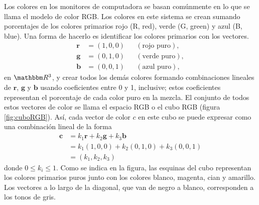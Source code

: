 \begin{adjustwidth}{-7.6cm}{-2cm}
    \begin{tcolorbox}[
        theorem style=change break,
        enhanced,
        breakable,
        boxrule=0pt,
        frame hidden,
        left = 1.8cm,
        right = 1.8cm,
        top=4mm,
        bottom=2mm,
        colback=cw2,
        coltitle=cw0,
        attach title to upper={\ },
        sharp corners,
        borderline north={1.5pt}{0pt}{cw0},
        title = {Aplicación de combinaciones lineales a modelos de color:},
        fonttitle=\selectfont\Lato\bfseries\LARGE,
        fontupper=\normalsize
    ]
        \begin{multicols}{2}
            Los colores en los monitores de computadora se basan comúnmente en lo que se llama el modelo de color RGB. Los colores en este sistema se crean sumando porcentajes de los colores primarios rojo (R, red), verde (G, green) y azul (B, blue). Una forma de hacerlo es identificar los colores primarios con los vectores.
            \begin{align*}
                \mathbf{r} & = (1, 0, 0) && (\text{rojo puro}), \\
                \mathbf{g} & = (0, 1, 0) && (\text{verde puro}), \\
                \mathbf{b} & = (0, 0, 1) && (\text{azul puro}),
            \end{align*}
            en $\RR[3]$, y crear todos los demás colores formando combinaciones lineales de $\mathbf{r}$, $\mathbf{g}$ y $\mathbf{b}$ usando coeficientes entre 0 y 1, inclusive; estos coeficientes representan el porcentaje de cada color puro en la mezcla. El conjunto de todos estos vectores de color se llama el espacio RGB o el cubo RGB (figura \ref{fig:cuboRGB}). Así, cada vector de color $c$ en este cubo se puede expresar como una combinación lineal de la forma
            \begin{align*}
                \mathbf{c} & = k_1\mathbf{r} + k_2\mathbf{g} + k_3\mathbf{b} \\
                & = k_1(1, 0, 0) + k_2(0, 1, 0) + k_3(0, 0, 1) \\
                & = (k_1, k_2, k_3)
            \end{align*}
            donde $0 \leq k_i \leq 1$. Como se indica en la figura, las esquinas del cubo representan los colores primarios puros junto con los colores blanco, magenta, cian y amarillo. Los vectores a lo largo de la diagonal, que van de negro a blanco, corresponden a los tonos de gris.

\end{multicols}
\end{tcolorbox}
\end{adjustwidth}
